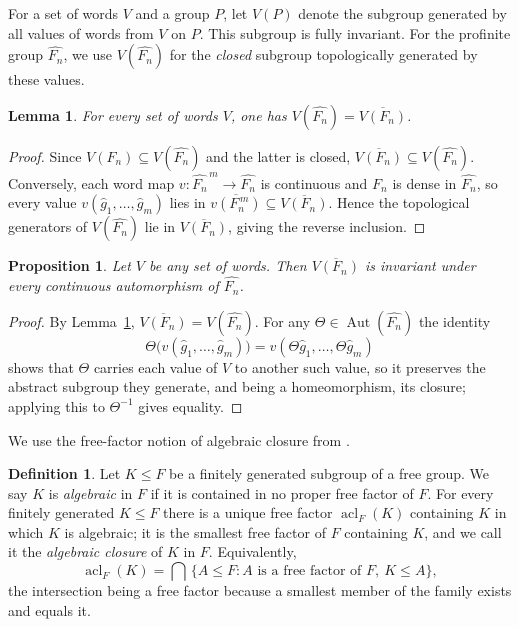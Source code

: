 \documentclass[11pt]{amsart}
\theoremstyle{plain}
\newtheorem{proposition}[theorem]{Proposition}
\newtheorem{lemma}[theorem]{Lemma}
\theoremstyle{definition}
\newtheorem{definition}[theorem]{Definition}
\newcommand{\acl}{\operatorname{acl}}
\newcommand{\Aut}{\operatorname{Aut}}
\begin{document}
For a set of words $V$ and a group $P$, let $V(P)$ denote the subgroup generated
by all values of words from $V$ on $P$. This subgroup is fully invariant. For
the profinite group $\widehat{F_n}$, we use $V(\widehat{F_n})$ for the
\emph{closed} subgroup topologically generated by these values.
\begin{lemma}\label{lem:verbal-closure}
For every set of words $V$, one has
$V(\widehat{F_n})=\overline{V(F_n)}$.
\end{lemma}
\begin{proof}
Since $V(F_n)\subseteq V(\widehat{F_n})$ and the latter is closed,
$\overline{V(F_n)}\subseteq V(\widehat{F_n})$. Conversely, each word map
$v\colon\widehat{F_n}^{\,m}\to\widehat{F_n}$ is continuous and $F_n$ is dense in
$\widehat{F_n}$, so every value $v(\hat g_1,\dots,\hat g_m)$ lies in
$\overline{v(F_n^{\,m})}\subseteq\overline{V(F_n)}$. Hence the topological
generators of $V(\widehat{F_n})$ lie in $\overline{V(F_n)}$, giving the reverse
inclusion.
\end{proof}
\begin{proposition}\label{prop:verbal-invariant}
Let $V$ be any set of words. Then $\overline{V(F_n)}$ is invariant under every
continuous automorphism of $\widehat{F_n}$.
\end{proposition}
\begin{proof}
By Lemma~\ref{lem:verbal-closure}, $\overline{V(F_n)}=V(\widehat{F_n})$. For any
$\Theta\in\Aut(\widehat{F_n})$ the identity
\[
  \Theta\bigl(v(\hat g_1,\dots,\hat g_m)\bigr)=v(\Theta\hat g_1,\dots,\Theta\hat g_m)
\]
shows that $\Theta$ carries each value of $V$ to another such value, so it
preserves the abstract subgroup they generate, and being a homeomorphism, its
closure; applying this to $\Theta^{-1}$ gives equality.
\end{proof}
We use the free-factor notion of algebraic closure from
\cite[Section 3.4]{MVW}.
\begin{definition}\label{def:acl}
Let $K\le F$ be a finitely generated subgroup of a free group. We say $K$ is
\emph{algebraic} in $F$ if it is contained in no proper free factor of $F$. For
every finitely generated $K\le F$ there is a unique free factor $\acl_F(K)$
containing $K$ in which $K$ is algebraic; it is the smallest free factor of $F$
containing $K$, and we call it the \emph{algebraic closure} of $K$ in $F$.
Equivalently,
\[
  \acl_F(K)=\bigcap\,\{A\le F: A\text{ is a free factor of }F,\ K\le A\},
\]
the intersection being a free factor because a smallest member of the family
exists and equals it.
\end{definition}
\end{document}
